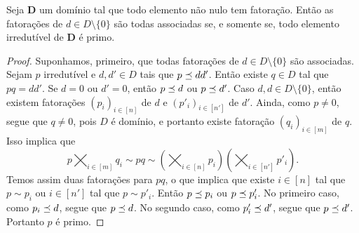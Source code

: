 \begin{proposition}
Seja $\bm D$ um domínio tal que todo elemento não nulo tem fatoração. Então as fatorações de $d \in D \setminus \{0\}$ são todas associadas se, e somente se, todo elemento irredutível de $\bm D$ é primo.
\end{proposition}
\begin{proof}
Suponhamos, primeiro, que todas fatorações de $d \in D \setminus \{0\}$ são associadas. Sejam $p$ irredutível e $d,d' \in D$ tais que $p \preceq dd'$. Então existe $q \in D$ tal que $pq=dd'$. Se $d=0$ ou $d'=0$, então $p \preceq d$ ou $p \preceq d'$. Caso $d,d \in D \setminus \{0\}$, então existem fatorações $(p_i)_{i \in [n]}$ de $d$ e $(p'_i)_{i \in [n']}$ de $d'$. Ainda, como $p \neq 0$, segue que $q \neq 0$, pois $D$ é domínio, e portanto existe fatoração $(q_i)_{i \in [m]}$ de $q$. Isso implica que
	\begin{equation*}
	p \bigtimes_{i \in [m]} q_i \sim pq \sim \left( \bigtimes_{i \in [n]} p_i \right) \left( \bigtimes_{i \in [n']} p'_i \right).
	\end{equation*}
Temos assim duas fatorações para $pq$, o que implica que existe $i \in [n]$ tal que $p \sim p_i$ ou $i \in [n']$ tal que $p \sim p'_i$. Então $p \preceq p_i$ ou $p \preceq p'_i$. No primeiro caso, como $p_i \preceq d$, segue que $p \preceq d$. No segundo caso, como $p'_i \preceq d'$, segue que $p \preceq d'$. Portanto $p$ é primo.


\end{proof}
